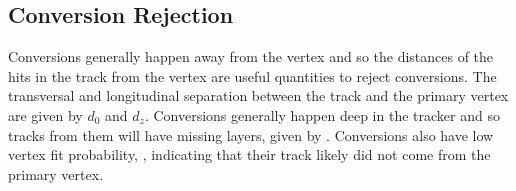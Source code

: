 \subsection{Conversion Rejection}

Conversions generally happen away from the vertex and so the distances of the
hits in the track from the vertex are useful quantities to reject conversions.
The transversal and longitudinal separation between the track and the primary
vertex are given by $d_{0}$ and $d_{z}$. Conversions generally happen deep in
the tracker and so tracks from them will have missing layers, given by \nmiss.
Conversions also have low vertex fit probability, \pvtx, indicating that their
track likely did not come from the primary vertex.
